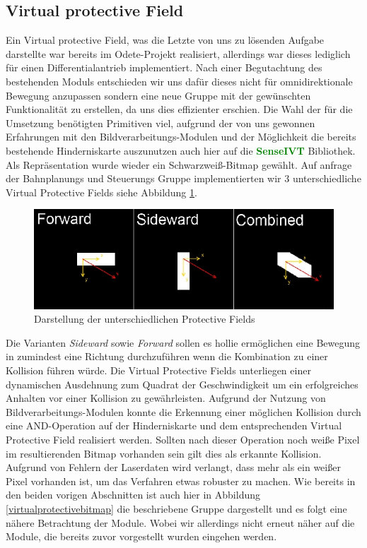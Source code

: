 \subsection{Virtual protective Field}
Ein Virtual protective Field, was die Letzte von uns zu lösenden Aufgabe darstellte war bereits im Odete-Projekt
 realisiert, allerdings war dieses lediglich für einen Differentialantrieb implementiert.
 Nach einer Begutachtung des bestehenden Moduls entschieden wir uns dafür
 dieses nicht für omnidirektionale Bewegung anzupassen sondern eine neue Gruppe mit der gewünschten Funktionalität
 zu erstellen, da uns dies effizienter erschien. Die Wahl der für die Umsetzung benötigten Primitiven viel, aufgrund
 der von uns gewonnen Erfahrungen mit den Bildverarbeitungs-Modulen und der Möglichkeit die bereits bestehende
 Hinderniskarte auszunutzen auch hier auf die \textcolor{green}{\textbf{SenseIVT}}  Bibliothek.
 Als Repräsentation wurde wieder ein Schwarzweiß-Bitmap gewählt. Auf anfrage der Bahnplanungs und Steuerungs
 Gruppe implementierten wir 3 unterschiedliche Virtual Protective Fields siehe
 Abbildung \ref{fig:virtualprotectivefields}.
 \begin{figure}[h]
\center
\includegraphics[scale=0.5]{graphics/virtualprotectivefields.jpg}
\caption{\label{fig:virtualprotectivefields} Darstellung der unterschiedlichen Protective
Fields}
\end{figure}
 Die Varianten \emph{Sideward} sowie \emph{Forward} sollen es \gls{hollie}
 ermöglichen eine Bewegung in zumindest eine Richtung durchzuführen wenn die Kombination zu einer Kollision führen würde.
 Die Virtual Protective Fields unterliegen einer dynamischen Ausdehnung zum Quadrat der Geschwindigkeit
 um ein erfolgreiches Anhalten vor einer Kollision zu gewährleisten. Aufgrund der Nutzung von Bildverarbeitungs-Modulen
 konnte die Erkennung einer möglichen Kollision durch eine AND-Operation auf der Hinderniskarte und dem entsprechenden
 Virtual Protective Field realisiert werden. Sollten nach dieser Operation noch weiße Pixel im resultierenden Bitmap
 vorhanden sein gilt dies als erkannte Kollision. Aufgrund von Fehlern der Laserdaten wird verlangt, dass mehr als ein
 weißer Pixel vorhanden ist, um das Verfahren etwas robuster zu machen.
 Wie bereits in den beiden vorigen Abschnitten  ist auch hier in Abbildung \ref{virtualprotectivebitmap}
 die beschriebene Gruppe dargestellt und es folgt eine nähere Betrachtung der Module.
 Wobei wir allerdings nicht erneut näher auf die Module, die bereits zuvor
 vorgestellt wurden eingehen werden.

